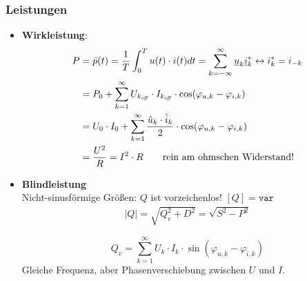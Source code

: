 \subsubsection{Leistungen}
\begin{itemize}  
	\item \textbf{Wirkleistung}:
\begin{align*}
			      P & = \bar{p}(t) = \frac{1}{T} \int_0^T u(t)\cdot i(t) dt
     		       = \sum_{k=-\infty}^{\infty}\underline{u}_k \underline{i}_k^* \leftrightarrow i_k^* = i_{-k}\\
     		       &= 
  			      P_0 + \sum_{k=1}^{\infty} U_{k_{\mathit{eff}}}\cdot
     		       I_{k_{\mathit{eff}}}\cdot\cos(\varphi_{u,k}-\varphi_{i,k})\\
     		       &= U_0 \cdot I_0 + \sum_{k=1}^{\infty} \frac{\hat{u}_k\cdot \hat{i}_k}{2} \cdot \cos(\varphi_{u,k}-\varphi_{i,k})\\
     		       & = \frac{U^2}{R}= I^2 \cdot R \text{\qquad rein am ohmschen Widerstand!}
\end{align*} 
		\item \textbf{Blindleistung}\\
		{\small Nicht-sinusf\"ormige Gr\"o\ss en: $Q$ ist vorzeichenlos! $[Q]=\texttt{var}$}
		\begin{gather*}
			|Q| = \sqrt{Q^2_v + D^2} = \sqrt{S^2-P^2}
		\end{gather*}
		
	      \begin{mdframed}[style=exercise,frametitle=Verschiebungs-/Feldblindleistung $Q_v$]
	      	\[
	      	Q_v = \sum_{k=1}^{\infty} U_k \cdot I_k \cdot \sin(\varphi_{u,k}-\varphi_{i,k})
	      	\]
{\small Gleiche Frequenz, aber Phasenverschiebung zwischen $U$ und $I$.}
	      \end{mdframed}
	      

\end{itemize}
